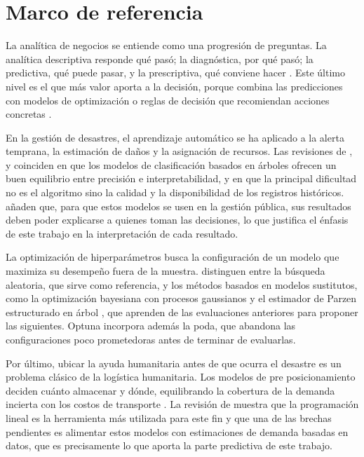 \documentclass[12pt,a4paper]{article}
\begin{document}
\section{Marco de referencia}

La analítica de negocios se entiende como una progresión de preguntas. La analítica descriptiva responde qué
pasó; la diagnóstica, por qué pasó; la predictiva, qué puede pasar, y la prescriptiva, qué conviene hacer
\citep{delen2018}. Este último nivel es el que más valor aporta a la decisión, porque combina las predicciones con
modelos de optimización o reglas de decisión que recomiendan acciones concretas \citep{lepenioti2020}.

En la gestión de desastres, el aprendizaje automático se ha aplicado a la alerta temprana, la estimación de daños
y la asignación de recursos. Las revisiones de \citet{sun2020}, \citet{linardos2022} y \citet{kyrkou2023}
coinciden en que los modelos de clasificación basados en árboles ofrecen un buen equilibrio entre precisión e
interpretabilidad, y en que la principal dificultad no es el algoritmo sino la calidad y la disponibilidad de los
registros históricos. \citet{ghaffarian2023} añaden que, para que estos modelos se usen en la gestión pública, sus
resultados deben poder explicarse a quienes toman las decisiones, lo que justifica el énfasis de este trabajo en
la interpretación de cada resultado.

La optimización de hiperparámetros busca la configuración de un modelo que maximiza su desempeño fuera de la
muestra. \citet{bischl2023} distinguen entre la búsqueda aleatoria, que sirve como referencia, y los métodos
basados en modelos sustitutos, como la optimización bayesiana con procesos gaussianos \citep{shahriari2016} y el
estimador de Parzen estructurado en árbol \citep{bergstra2015}, que aprenden de las evaluaciones anteriores para
proponer las siguientes. Optuna \citep{akiba2019} incorpora además la poda, que abandona las configuraciones poco
prometedoras antes de terminar de evaluarlas.

Por último, ubicar la ayuda humanitaria antes de que ocurra el desastre es un problema clásico de la logística
humanitaria. Los modelos de pre posicionamiento deciden cuánto almacenar y dónde, equilibrando la cobertura de la
demanda incierta con los costos de transporte \citep{balcik2008,rawls2010}. La revisión de \citet{sabbaghtorkan2020}
muestra que la programación lineal es la herramienta más utilizada para este fin y que una de las brechas
pendientes es alimentar estos modelos con estimaciones de demanda basadas en datos, que es precisamente lo que
aporta la parte predictiva de este trabajo.
\end{document}

